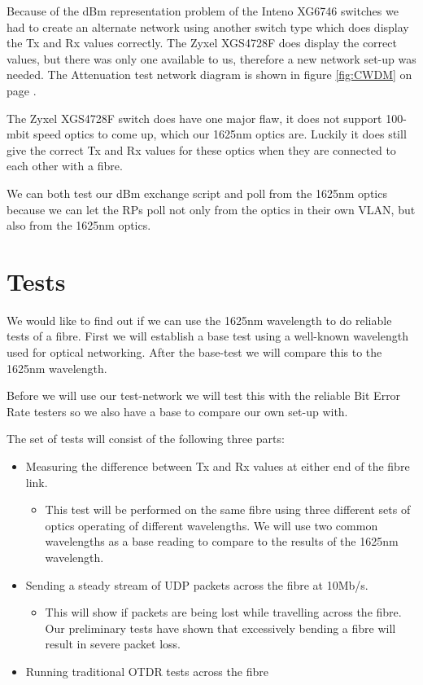 \documentclass{article}
\begin{document}
Because of the dBm representation problem of the Inteno XG6746 switches we had to create an alternate network using another switch type which does display the Tx and Rx values correctly. The Zyxel XGS4728F does display the correct values, but there was only one available to us, therefore a new network set-up was needed. The Attenuation test network diagram is shown in figure \ref{fig:CWDM} on page \pageref{fig:CWDM}.

The Zyxel XGS4728F switch does have one major flaw, it does not support 100-mbit speed optics to come up, which our 1625nm optics are. Luckily it does still give the correct Tx and Rx values for these optics when they are connected to each other with a fibre.

We can both test our dBm exchange script and poll from the 1625nm optics because we can let the RPs poll not only from the optics in their own VLAN, but also from the 1625nm optics.

\newpage
\section{Tests}
We would like to find out if we can use the 1625nm wavelength to do reliable tests of a fibre. First we will establish a base test using a well-known wavelength used for optical networking. After the base-test we will compare this to the 1625nm wavelength.

Before we will use our test-network we will test this with the reliable Bit Error Rate testers so we also have a base to compare our own set-up with.

The set of tests will consist of the following three parts:
\begin{itemize}
\item Measuring the difference between Tx and Rx values at either end of the fibre link.
	\begin{itemize}
	\item This test will be performed on the same fibre using three different sets of optics operating of different wavelengths.  We will use two common wavelengths as a base reading to compare to the results of the 1625nm wavelength.
	\end{itemize}
\item Sending a steady stream of UDP packets across the fibre at 10Mb/s.
	\begin{itemize}
	\item This will show if packets are being lost while travelling across the fibre. Our preliminary tests have shown that excessively bending a fibre will result in severe packet loss.
	\end{itemize}
\item Running traditional OTDR tests across the fibre
\end{itemize}
\end{document}
